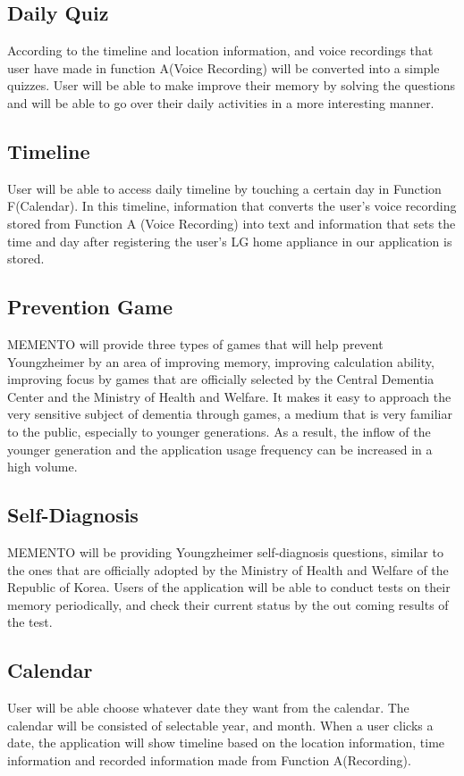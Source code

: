\documentclass[conference]{IEEEtran}
\begin{document}
\subsection{Daily Quiz}
According to the timeline and location information, and voice recordings that user have made in function A(Voice Recording) will be converted into a simple quizzes. User will be able to make improve their memory by solving the questions and will be able to go over their daily activities in a more interesting manner.\\
\subsection{Timeline}
User will be able to access daily timeline by touching a certain day in Function F(Calendar). In this timeline, information that converts the user's voice recording stored from Function A (Voice Recording) into text and information that sets the time and day after registering the user's LG home appliance in our application is stored. \\
\subsection{Prevention Game}
MEMENTO will provide three types of games that will help prevent Youngzheimer by an area of improving memory, improving calculation ability, improving focus by games that are officially selected by the Central Dementia Center and the Ministry of Health and Welfare. It makes it easy to approach the very sensitive subject of dementia through games, a medium that is very familiar to the public, especially to younger generations. As a result, the inflow of the younger generation and the application usage frequency can be increased in a high volume.
\subsection{Self-Diagnosis}
MEMENTO will be providing Youngzheimer self-diagnosis questions, similar to the ones that are officially adopted by the Ministry of Health and Welfare of the Republic of Korea. Users of the application will be able to conduct tests on their memory periodically, and check their current status by the out coming results of the test.
\subsection{Calendar}
User will be able choose whatever date they want from the calendar. The calendar will be consisted of selectable year, and month. When a user clicks a date, the application will show timeline based on the location information, time information and recorded information made from Function A(Recording).
\end{document}
